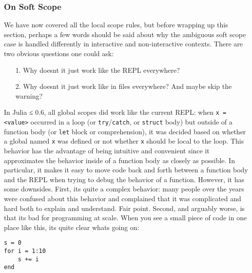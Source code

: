 \hypertarget{1371816050938225763}{}


\subsubsection{On Soft Scope}



We have now covered all the local scope rules, but before wrapping up this section, perhaps a few words should be said about why the ambiguous soft scope case is handled differently in interactive and non-interactive contexts. There are two obvious questions one could ask:



\begin{itemize}
\item[1. ] Why doesn{\textquotesingle}t it just work like the REPL everywhere?


\item[2. ] Why doesn{\textquotesingle}t it just work like in files everywhere? And maybe skip the warning?

\end{itemize}


In Julia ≤ 0.6, all global scopes did work like the current REPL: when \texttt{x = <value>} occurred in a loop (or \texttt{try}/\texttt{catch}, or \texttt{struct} body) but outside of a function body (or \texttt{let} block or comprehension), it was decided based on whether a global named \texttt{x} was defined or not whether \texttt{x} should be local to the loop. This behavior has the advantage of being intuitive and convenient since it approximates the behavior inside of a function body as closely as possible. In particular, it makes it easy to move code back and forth between a function body and the REPL when trying to debug the behavior of a function. However, it has some downsides. First, it{\textquotesingle}s quite a complex behavior: many people over the years were confused about this behavior and complained that it was complicated and hard both to explain and understand. Fair point. Second, and arguably worse, is that it{\textquotesingle}s bad for programming {\textquotedbl}at scale.{\textquotedbl} When you see a small piece of code in one place like this, it{\textquotesingle}s quite clear what{\textquotesingle}s going on:




\begin{verbatim}
s = 0
for i = 1:10
    s += i
end
\end{verbatim}




